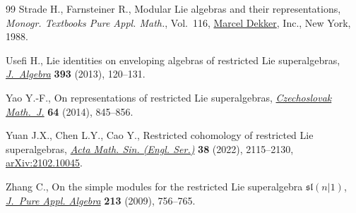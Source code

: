 \begin{thebibliography}{99}
Strade H., Farnsteiner R., Modular {L}ie algebras and their representations,
 \textit{Monogr. Textbooks Pure Appl. Math.}, Vol.~116, \href{https://doi.org/10.1201/9781003065630}{Marcel Dekker}, Inc.,
 New York, 1988.

Usefi H., Lie identities on enveloping algebras of restricted {L}ie
 superalgebras, \href{https://doi.org/10.1016/j.jalgebra.2013.06.026}{\textit{J.~Algebra}} \textbf{393} (2013), 120--131.

Yao Y.-F., On representations of restricted {L}ie superalgebras,
\href{https://doi.org/10.1007/s10587-014-0137-2}{\textit{Czechoslovak Math.~J.}} \textbf{64} (2014), 845--856.

Yuan J.X., Chen L.Y., Cao Y., Restricted cohomology of restricted {L}ie
 superalgebras, \href{https://doi.org/10.1007/s10114-022-1088-4}{\textit{Acta Math. Sin. (Engl. Ser.)}} \textbf{38} (2022),
 2115--2130, \href{https://arxiv.org/abs/2102.10045}{arXiv:2102.10045}.

Zhang C., On the simple modules for the restricted {L}ie superalgebra
 {${\mathfrak{sl}}(n|1)$}, \href{https://doi.org/10.1016/j.jpaa.2008.09.005}{\textit{J.~Pure Appl. Algebra}} \textbf{213} (2009),
 756--765.

\end{thebibliography}
